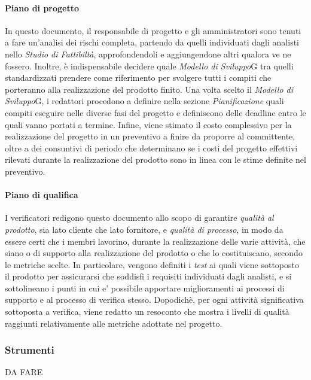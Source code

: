 		\paragraph{Piano di progetto}
In questo documento, il responsabile di progetto e gli amministratori sono tenuti a fare un'analisi dei rischi completa, partendo da quelli individuati dagli analisti nello \textit{Studio di Fattibiltà}, approfondendoli e aggiungendone altri qualora ve ne fossero. Inoltre, è indispensabile decidere quale \textit{Modello di Sviluppo}{G} tra quelli standardizzati prendere come riferimento per svolgere tutti i compiti che porteranno alla realizzazione del prodotto finito. Una volta scelto il \textit{Modello di Sviluppo}{G}, i redattori procedono a definire nella sezione \textit{Pianificazione} quali compiti eseguire nelle diverse fasi del progetto e definiscono delle deadline entro le quali vanno portati a termine. Infine, viene stimato il costo complessivo per la realizzazione del progetto in un preventivo a finire da proporre al committente, oltre a dei consuntivi di periodo che determinano se i costi del progetto effettivi rilevati durante la realizzazione del prodotto sono in linea con le stime definite nel preventivo.
		\paragraph{Piano di qualifica}
 I verificatori redigono questo documento allo scopo di garantire \textit{qualità al prodotto}, sia lato cliente che lato fornitore, e \textit{qualità di processo}, in modo da essere certi che i membri lavorino, durante la realizzazione delle varie attività, che siano o di supporto alla realizzazione del prodotto o che lo costituiscano, secondo le metriche scelte. In particolare, vengono definiti i \textit{test} ai quali viene sottoposto il prodotto per assicurarsi che soddisfi i requisiti individuati dagli analisti, e si sottolineano i punti in cui e' possibile apportare miglioramenti ai processi di supporto e al processo di verifica stesso. Dopodichè, per ogni attività significativa sottoposta a verifica, viene redatto un resoconto che mostra i livelli di qualità raggiunti relativamente alle metriche adottate nel progetto.
	\subsubsection{Strumenti}
	DA FARE